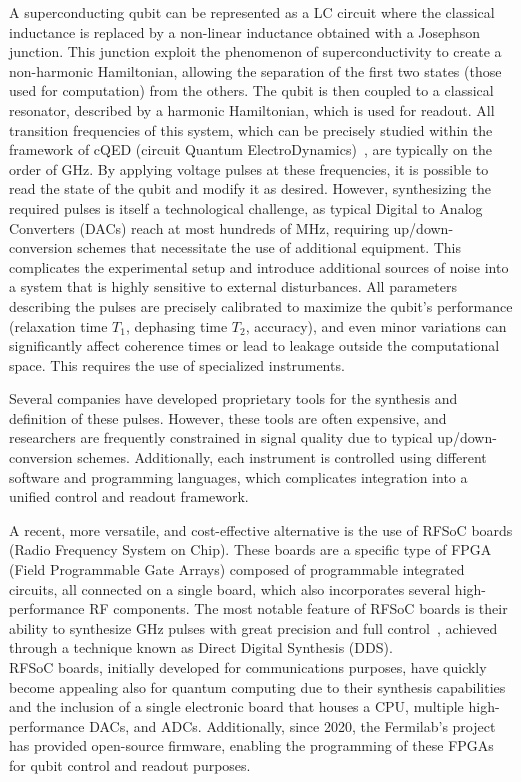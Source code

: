 A superconducting qubit can be represented as a LC circuit where the classical inductance is replaced by a non-linear inductance obtained with a Josephson junction.
This junction exploit the phenomenon of superconductivity to create a non-harmonic Hamiltonian, allowing the separation of the first two states (those used for computation) from the others.
The qubit is then coupled to a classical resonator, described by a harmonic Hamiltonian, which is used for readout.
%
All transition frequencies of this system, which can be precisely studied within the framework of cQED (circuit Quantum ElectroDynamics)~\cite{Blais2021}, are typically on the order of GHz.
%
By applying voltage pulses at these frequencies, it is possible to read the state of the qubit and modify it as desired.
%
However, synthesizing the required pulses is itself a technological challenge, as typical Digital to Analog Converters (DACs) reach at most hundreds of MHz, requiring up/down-conversion schemes that necessitate the use of additional equipment.
This complicates the experimental setup and introduce additional sources of noise into a system that is highly sensitive to external disturbances.
%
All parameters describing the pulses are precisely calibrated to maximize the qubit's performance (relaxation time $T_1$, dephasing time $T_2$, accuracy), and even minor variations can significantly affect coherence times or lead to leakage outside the computational space.
This requires the use of specialized instruments.

Several companies have developed proprietary tools for the synthesis and definition of these pulses.
However, these tools are often expensive, and researchers are frequently constrained in signal quality due to typical up/down-conversion schemes.
Additionally, each instrument is controlled using different software and programming languages, which complicates integration into a unified control and readout framework.

A recent, more versatile, and cost-effective alternative is the use of RFSoC boards (Radio Frequency System on Chip).
These boards are a specific type of FPGA (Field Programmable Gate Arrays) composed of programmable integrated circuits, all connected on a single board, which also incorporates several high-performance RF components.
The most notable feature of RFSoC boards is their ability to synthesize GHz pulses with great precision and full control~\cite{Kalfus2020}, achieved through a technique known as Direct Digital Synthesis (DDS).\\
%
RFSoC boards, initially developed for communications purposes, have quickly become appealing also for quantum computing due to their synthesis capabilities and the inclusion of a single electronic board that houses a CPU, multiple high-performance DACs, and ADCs.
Additionally, since 2020, the Fermilab's \Qick project~\cite{Stefanazzi2022} has provided open-source firmware, enabling the programming of these FPGAs for qubit control and readout purposes.

